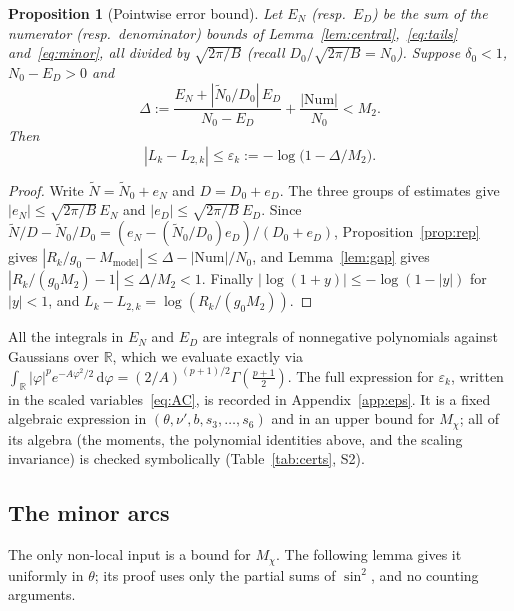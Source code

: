 \documentclass[11pt]{amsart}
\newtheorem{proposition}[theorem]{Proposition}
\theoremstyle{definition}
\theoremstyle{remark}
\numberwithin{equation}{section}
\newcommand{\RR}{\mathbb{R}}
\newcommand{\dd}{\,\mathrm{d}}
\begin{document}
\begin{proposition}[Pointwise error bound]\label{prop:eps}
Let $E_N$ (resp.\ $E_D$) be the sum of the numerator (resp.\ denominator) bounds of Lemma~\ref{lem:central},~\eqref{eq:tails}
and~\eqref{eq:minor}, all divided by $\sqrt{2\pi/B}$ (recall $D_0/\sqrt{2\pi/B}=N_0$). Suppose $\delta_0<1$, $N_0-E_D>0$ and
\[
  \Delta:=\frac{E_N+|\tilde N_0/D_0|\,E_D}{N_0-E_D}+\frac{|\mathrm{Num}|}{N_0}<M_2 .
\]
Then
\begin{equation}\label{eq:eps}
  |L_k-L_{2,k}|\le\varepsilon_k:=-\log\bigl(1-\Delta/M_2\bigr).
\end{equation}
\end{proposition}

\begin{proof}
Write $\tilde N=\tilde N_0+e_N$ and $D=D_0+e_D$. The three groups of estimates give $|e_N|\le\sqrt{2\pi/B}\,E_N$ and
$|e_D|\le\sqrt{2\pi/B}\,E_D$. Since
$\tilde N/D-\tilde N_0/D_0=(e_N-(\tilde N_0/D_0)e_D)/(D_0+e_D)$, Proposition~\ref{prop:rep} gives
$|R_k/g_0-M_{\mathrm{model}}|\le\Delta-|\mathrm{Num}|/N_0$, and Lemma~\ref{lem:gap} gives $|R_k/(g_0M_2)-1|\le\Delta/M_2<1$. Finally
$|\log(1+y)|\le-\log(1-|y|)$ for $|y|<1$, and $L_k-L_{2,k}=\log(R_k/(g_0M_2))$.
\end{proof}

All the integrals in $E_N$ and $E_D$ are integrals of nonnegative polynomials against Gaussians over $\RR$, which we evaluate exactly
via $\int_\RR|\varphi|^pe^{-A\varphi^2/2}\dd\varphi=(2/A)^{(p+1)/2}\Gamma(\frac{p+1}2)$. The full expression for $\varepsilon_k$, written
in the scaled variables~\eqref{eq:AC}, is recorded in Appendix~\ref{app:eps}. It is a fixed algebraic expression in
$(\theta,\nu',b,s_3,\dots,s_6)$ and in an upper bound for $M_\chi$; all of its algebra (the moments, the polynomial
identities above, and the scaling invariance) is checked symbolically (Table~\ref{tab:certs}, S2).

\subsection{The minor arcs}
The only non-local input is a bound for $M_\chi$. The following lemma gives it uniformly in $\theta$; its proof uses only the
partial sums of $\sin^2$, and no counting arguments.
\end{document}
